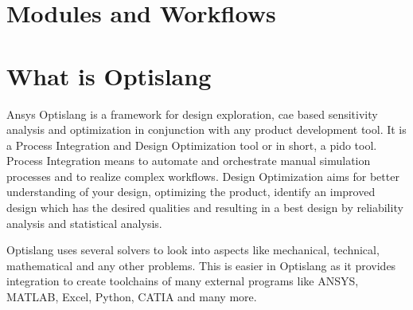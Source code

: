 \section{Modules and Workflows}

\section{What is Optislang}
Ansys Optislang is a framework for design exploration, \ac{cae} based sensitivity analysis and optimization in conjunction with any product development tool. It is a Process Integration and 
Design Optimization tool or in short, a \acrshort{pido} tool. Process Integration means to automate and orchestrate manual simulation processes and to realize
complex workflows. Design Optimization aims for better understanding of your design, optimizing the product, identify an improved design which has the desired
qualities and resulting in a best design by reliability analysis and statistical analysis.  


Optislang uses several solvers to look into aspects like mechanical, technical, mathematical and any other problems. This is easier in Optislang as it provides
integration to create toolchains of many external programs like ANSYS, MATLAB, Excel, Python, CATIA and many more.
